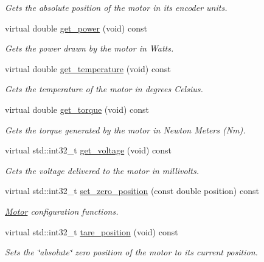 \begin{DoxyCompactItemize}
\begin{DoxyCompactList}\small\item\em Gets the absolute position of the motor in its encoder units. \end{DoxyCompactList}\item 
virtual double \mbox{\hyperlink{classpros_1_1Motor_a51b75dc245257487116e64fa2904d521}{get\+\_\+power}} (void) const
\begin{DoxyCompactList}\small\item\em Gets the power drawn by the motor in Watts. \end{DoxyCompactList}\item 
virtual double \mbox{\hyperlink{classpros_1_1Motor_a9fd793251b91c2ac0091c65f290f740d}{get\+\_\+temperature}} (void) const
\begin{DoxyCompactList}\small\item\em Gets the temperature of the motor in degrees Celsius. \end{DoxyCompactList}\item 
virtual double \mbox{\hyperlink{classpros_1_1Motor_a14e0c57c0ca7bde15f73414abf4c3c8e}{get\+\_\+torque}} (void) const
\begin{DoxyCompactList}\small\item\em Gets the torque generated by the motor in Newton Meters (Nm). \end{DoxyCompactList}\item 
virtual std\+::int32\+\_\+t \mbox{\hyperlink{classpros_1_1Motor_abe51732c37c2ec72a8bdceac7f6962cb}{get\+\_\+voltage}} (void) const
\begin{DoxyCompactList}\small\item\em Gets the voltage delivered to the motor in millivolts. \end{DoxyCompactList}\item 
virtual std\+::int32\+\_\+t \mbox{\hyperlink{classpros_1_1Motor_af20c036c1d5d68eb5e762c12f9a4b7fe}{set\+\_\+zero\+\_\+position}} (const double position) const
\begin{DoxyCompactList}\small\item\em \mbox{\hyperlink{classpros_1_1Motor}{Motor}} configuration functions. \end{DoxyCompactList}\item 
virtual std\+::int32\+\_\+t \mbox{\hyperlink{classpros_1_1Motor_a5d67803a65fa699a169a4ed5a107a964}{tare\+\_\+position}} (void) const
\begin{DoxyCompactList}\small\item\em Sets the \char`\"{}absolute\char`\"{} zero position of the motor to its current position. \end{DoxyCompactList}\item 

\end{DoxyCompactItemize}
